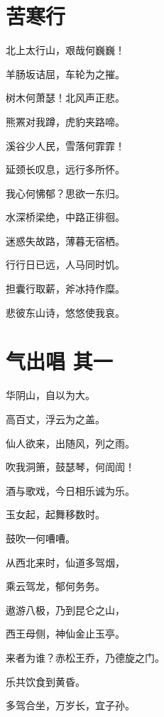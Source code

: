 \documentclass[12pt,a4paper]{ctexbook}
\begin{document}
\section{苦寒行}
北上太行山，艰哉何巍巍！\par
羊肠坂诘屈，车轮为之摧。\par
树木何萧瑟！北风声正悲。\par
熊罴对我蹲，虎豹夹路啼。\par
溪谷少人民，雪落何霏霏！\par
延颈长叹息，远行多所怀。\par
我心何怫郁？思欲一东归。\par
水深桥梁绝，中路正徘徊。\par
迷惑失故路，薄暮无宿栖。\par
行行日已远，人马同时饥。\par
担囊行取薪，斧冰持作糜。\par
悲彼东山诗，悠悠使我哀。\par

\section{气出唱 其一}
华阴山，自以为大。\par
高百丈，浮云为之盖。\par
仙人欲来，出随风，列之雨。\par
吹我洞箫，鼓瑟琴，何訚訚！\par
酒与歌戏，今日相乐诚为乐。\par
玉女起，起舞移数时。\par
鼓吹一何嘈嘈。\par
从西北来时，仙道多驾烟，\par
乘云驾龙，郁何务务。\par
遨游八极，乃到昆仑之山，\par
西王母侧，神仙金止玉亭。\par
来者为谁？赤松王乔，乃德旋之门。\par
乐共饮食到黄昏。\par
多驾合坐，万岁长，宜子孙。\par
\end{document}
